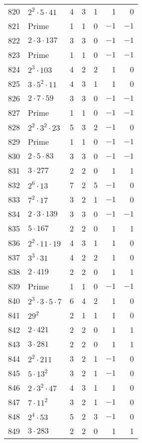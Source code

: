 \documentclass[12pt]{article}
\begin{document}
\begin{tabular}{|r|l|r|r|r|r|r|}
820 & $2^2 \cdot 5 \cdot 41$ & 4 & 3 & 1 & 1 & 0 \\
821 & Prime & 1 & 1 & 0 & $-1$ & $-1$ \\
822 & $2 \cdot 3 \cdot 137$ & 3 & 3 & 0 & $-1$ & $-1$ \\
823 & Prime & 1 & 1 & 0 & $-1$ & $-1$ \\
824 & $2^3 \cdot 103$ & 4 & 2 & 2 & 1 & 0 \\
825 & $3 \cdot 5^2 \cdot 11$ & 4 & 3 & 1 & 1 & 0 \\
826 & $2 \cdot 7 \cdot 59$ & 3 & 3 & 0 & $-1$ & $-1$ \\
827 & Prime & 1 & 1 & 0 & $-1$ & $-1$ \\
828 & $2^2 \cdot 3^2 \cdot 23$ & 5 & 3 & 2 & $-1$ & 0 \\
829 & Prime & 1 & 1 & 0 & $-1$ & $-1$ \\
830 & $2 \cdot 5 \cdot 83$ & 3 & 3 & 0 & $-1$ & $-1$ \\
831 & $3 \cdot 277$ & 2 & 2 & 0 & 1 & 1 \\
832 & $2^6 \cdot 13$ & 7 & 2 & 5 & $-1$ & 0 \\
833 & $7^2 \cdot 17$ & 3 & 2 & 1 & $-1$ & 0 \\
834 & $2 \cdot 3 \cdot 139$ & 3 & 3 & 0 & $-1$ & $-1$ \\
835 & $5 \cdot 167$ & 2 & 2 & 0 & 1 & 1 \\
836 & $2^2 \cdot 11 \cdot 19$ & 4 & 3 & 1 & 1 & 0 \\
837 & $3^3 \cdot 31$ & 4 & 2 & 2 & 1 & 0 \\
838 & $2 \cdot 419$ & 2 & 2 & 0 & 1 & 1 \\
839 & Prime & 1 & 1 & 0 & $-1$ & $-1$ \\
840 & $2^3 \cdot 3 \cdot 5 \cdot 7$ & 6 & 4 & 2 & 1 & 0 \\
841 & $29^2$ & 2 & 1 & 1 & 1 & 0 \\
842 & $2 \cdot 421$ & 2 & 2 & 0 & 1 & 1 \\
843 & $3 \cdot 281$ & 2 & 2 & 0 & 1 & 1 \\
844 & $2^2 \cdot 211$ & 3 & 2 & 1 & $-1$ & 0 \\
845 & $5 \cdot 13^2$ & 3 & 2 & 1 & $-1$ & 0 \\
846 & $2 \cdot 3^2 \cdot 47$ & 4 & 3 & 1 & 1 & 0 \\
847 & $7 \cdot 11^2$ & 3 & 2 & 1 & $-1$ & 0 \\
848 & $2^4 \cdot 53$ & 5 & 2 & 3 & $-1$ & 0 \\
849 & $3 \cdot 283$ & 2 & 2 & 0 & 1 & 1 \\

\end{tabular}
\end{document}
